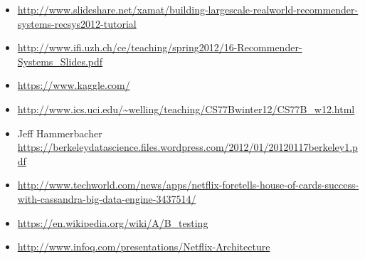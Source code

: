 \begin{itemize}

\item
  \url{http://www.slideshare.net/xamat/building-largescale-realworld-recommender-systems-recsys2012-tutorial}
\item
  \url{http://www.ifi.uzh.ch/ce/teaching/spring2012/16-Recommender-Systems_Slides.pdf}
\item
  \url{https://www.kaggle.com/}
\item
  \url{http://www.ics.uci.edu/~welling/teaching/CS77Bwinter12/CS77B_w12.html}
\item
  Jeff Hammerbacher
  \url{https://berkeleydatascience.files.wordpress.com/2012/01/20120117berkeley1.pdf}
\item
  \url{http://www.techworld.com/news/apps/netflix-foretells-house-of-cards-success-with-cassandra-big-data-engine-3437514/}
\item
  \url{https://en.wikipedia.org/wiki/A/B_testing}
\item
  \url{http://www.infoq.com/presentations/Netflix-Architecture}
\end{itemize}
